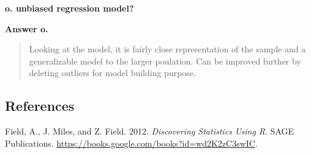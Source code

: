 \documentclass[
]{article}
\begin{document}
\textbf{o. unbiased regression model? }

\textbf{Answer o.}

\begin{quote}
Looking at the model, it is fairly close representation of the sample
and a generalizable model to the larger poulation. Can be improved
further by deleting outliers for model building purpose.
\end{quote}

\hypertarget{references}{%
\subsection*{References}\label{references}}

\hypertarget{refs}{}
\leavevmode\hypertarget{ref-field2012discovering}{}%
Field, A., J. Miles, and Z. Field. 2012. \emph{Discovering Statistics
Using R}. SAGE Publications.
\url{https://books.google.com/books?id=wd2K2zC3swIC}.
\end{document}
